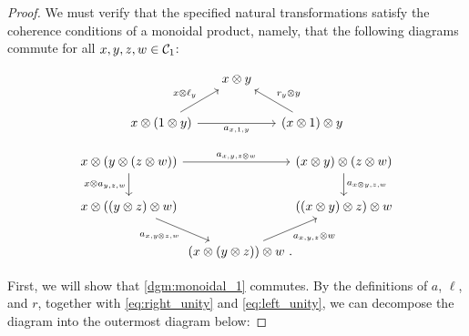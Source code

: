 \documentclass[openany, amssymb, psamsfonts]{amsart}
\theoremstyle{definition}
\numberwithin{equation}{section}
\begin{document}
\begin{proof}
We must verify that the specified natural transformations satisfy the coherence conditions of a monoidal product, namely, that the following diagrams commute for all $x, y, z, w \in \mathcal{C}_1$:

\begin{equation}\label{dgm:monoidal_1}
    \begin{tikzcd}[column sep = 1.5em]
        & x \otimes y &\\
        x \otimes (1 \otimes y) \ar[ur, "{x \otimes \ell_y}"] \ar[rr, "{a_{x, 1, y}}"'] && (x \otimes 1) \otimes y \ar[ul, "{r_y \otimes y}"']
    \end{tikzcd} 
\end{equation}

\begin{equation}\label{dgm:monoidal_2}
    \begin{tikzcd}[column sep = 0em]
        x \otimes (y \otimes (z \otimes w)) \ar[rr, "{a_{x, y, z \otimes w}}"] \ar[d, "{x \otimes a_{y, z, w}}"'] && (x \otimes y) \otimes (z \otimes w) \ar[d, "{a_{x \otimes y, z, w}}"]\\
        x \otimes ((y \otimes z) \otimes w) \ar[dr, "{a_{x, y \otimes z, w}}"'] && ((x \otimes y) \otimes z) \otimes w \\
        & (x \otimes (y \otimes z)) \otimes w \period \ar[ur, "{a_{x, y, z} \otimes w}"']
    \end{tikzcd}
\end{equation}

\vspace{0.5em}

 First, we will show that \eqref{dgm:monoidal_1} commutes. By the definitions of $a$, $\ell$, and $r$, together with \eqref{eq:right_unity} and \eqref{eq:left_unity}, we can decompose the diagram into the outermost diagram below:



\end{proof}
\end{document}
